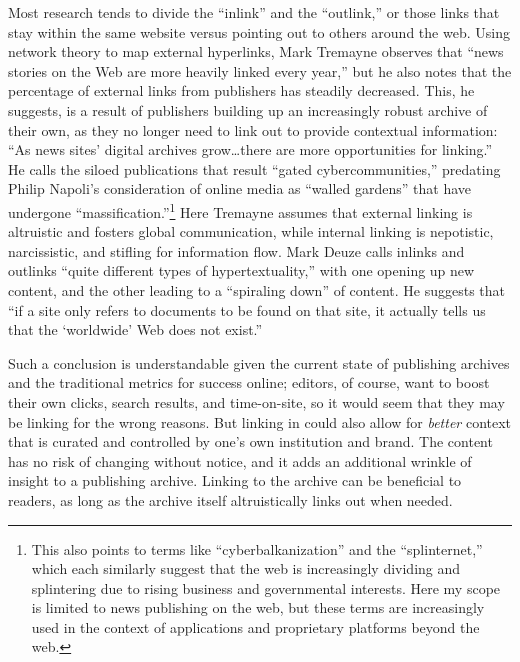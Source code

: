 Most research tends to divide the ``inlink'' and the ``outlink,'' or those links that stay within the same website versus pointing out to others around the web. Using network theory to map external hyperlinks, Mark Tremayne observes that ``news stories on the Web are more heavily linked every year,'' but he also notes that the percentage of external links from publishers has steadily decreased.\autocite[49]{li_applying_2013} This, he suggests, is a result of publishers building up an increasingly robust archive of their own, as they no longer need to link out to provide contextual information: ``As news sites' digital archives grow\ldots there are more opportunities for linking.''\autocite[241]{tremayne_web_2004} He calls the siloed publications that result ``gated cybercommunities,'' predating Philip Napoli's consideration of online media as ``walled gardens'' that have undergone ``massification.''\footnote{This also points to terms like ``cyberbalkanization'' and the ``splinternet,'' which each similarly suggest that the web is increasingly dividing and splintering due to rising business and governmental interests. Here my scope is limited to news publishing on the web, but these terms are increasingly used in the context of applications and proprietary platforms beyond the web.} Here Tremayne assumes that external linking is altruistic and fosters global communication, while internal linking is nepotistic, narcissistic, and stifling for information flow. Mark Deuze calls inlinks and outlinks ``quite different types of hypertextuality,'' with one opening up new content, and the other leading to a ``spiraling down'' of content. He suggests that ``if a site only refers to documents to be found on that site, it actually tells us that the `worldwide' Web does not exist.''\autocite{deuze_online_2001}

Such a conclusion is understandable given the current state of publishing archives and the traditional metrics for success online; editors, of course, want to boost their own clicks, search results, and time-on-site, so it would seem that they may be linking for the wrong reasons. But linking in could also allow for \emph{better} context that is curated and controlled by one's own institution and brand. The content has no risk of changing without notice, and it adds an additional wrinkle of insight to a publishing archive. Linking to the archive can be beneficial to readers, as long as the archive itself altruistically links out when needed.

